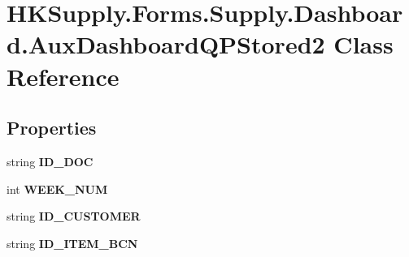 \hypertarget{class_h_k_supply_1_1_forms_1_1_supply_1_1_dashboard_1_1_aux_dashboard_q_p_stored2}{}\section{H\+K\+Supply.\+Forms.\+Supply.\+Dashboard.\+Aux\+Dashboard\+Q\+P\+Stored2 Class Reference}
\label{class_h_k_supply_1_1_forms_1_1_supply_1_1_dashboard_1_1_aux_dashboard_q_p_stored2}
\subsection*{Properties}
\begin{DoxyCompactItemize}
\item 
\mbox{\label{class_h_k_supply_1_1_forms_1_1_supply_1_1_dashboard_1_1_aux_dashboard_q_p_stored2_ae6d72cde397c9033a9573240c7b73f58}} 
string {\bfseries I\+D\+\_\+\+D\+OC}
\item 
\mbox{\label{class_h_k_supply_1_1_forms_1_1_supply_1_1_dashboard_1_1_aux_dashboard_q_p_stored2_ab795f73e2b9a79136c7d4b7582d189ea}} 
int {\bfseries W\+E\+E\+K\+\_\+\+N\+UM}
\item 
\mbox{\label{class_h_k_supply_1_1_forms_1_1_supply_1_1_dashboard_1_1_aux_dashboard_q_p_stored2_ae7303480b0733eeeb4d263e840c65784}} 
string {\bfseries I\+D\+\_\+\+C\+U\+S\+T\+O\+M\+ER}
\item 
\mbox{\label{class_h_k_supply_1_1_forms_1_1_supply_1_1_dashboard_1_1_aux_dashboard_q_p_stored2_a4ebea5cabaf1bac9501578e56213e750}} 
string {\bfseries I\+D\+\_\+\+I\+T\+E\+M\+\_\+\+B\+CN}

\end{DoxyCompactItemize}
